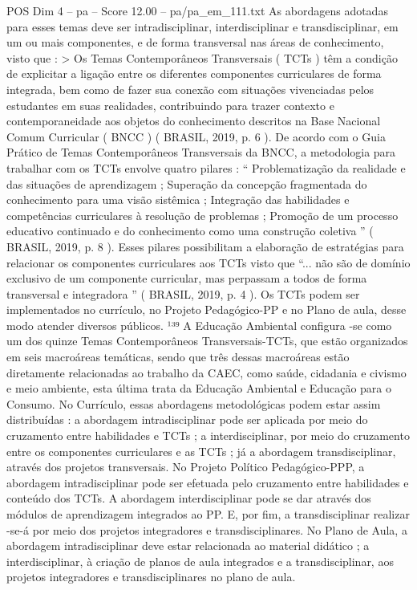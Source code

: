 \begin{textsample}{POS Dim 4 – pa – Score 12.00 – pa/pa\_em\_111.txt}
As abordagens adotadas para esses temas deve ser intradisciplinar, interdisciplinar e transdisciplinar, em um ou mais componentes, e de forma transversal nas áreas de conhecimento, visto que : > Os Temas Contemporâneos Transversais ( TCTs ) têm a condição de explicitar a ligação entre os diferentes componentes curriculares de forma integrada, bem como de fazer sua conexão com situações vivenciadas pelos estudantes em suas realidades, contribuindo para trazer contexto e contemporaneidade aos objetos do conhecimento descritos na Base Nacional Comum Curricular ( BNCC ) ( BRASIL, 2019, p. 6 ).
De acordo com o Guia Prático de Temas Contemporâneos Transversais da BNCC, a metodologia para trabalhar com os TCTs envolve quatro pilares : “ Problematização da realidade e das situações de aprendizagem ; Superação da concepção fragmentada do conhecimento para uma visão sistêmica ; Integração das habilidades e competências curriculares à resolução de problemas ; Promoção de um processo educativo continuado e do conhecimento como uma construção coletiva ” ( BRASIL, 2019, p. 8 ).
Esses pilares possibilitam a elaboração de estratégias para relacionar os componentes curriculares aos TCTs visto que “... não são de domínio exclusivo de um componente curricular, mas perpassam a todos de forma transversal e integradora ” ( BRASIL, 2019, p. 4 ).
Os TCTs podem ser implementados no currículo, no Projeto Pedagógico-PP e no Plano de aula, desse modo atender diversos públicos. ¹³⁹ A Educação Ambiental configura -se como um dos quinze Temas Contemporâneos Transversais-TCTs, que estão organizados em seis macroáreas temáticas, sendo que três dessas macroáreas estão diretamente relacionadas ao trabalho da CAEC, como saúde, cidadania e civismo e meio ambiente, esta última trata da Educação Ambiental e Educação para o Consumo.
No Currículo, essas abordagens metodológicas podem estar assim distribuídas : a abordagem intradisciplinar pode ser aplicada por meio do cruzamento entre habilidades e TCTs ; a interdisciplinar, por meio do cruzamento entre os componentes curriculares e as TCTs ; já a abordagem transdisciplinar, através dos projetos transversais.
No Projeto Político Pedagógico-PPP, a abordagem intradisciplinar pode ser efetuada pelo cruzamento entre habilidades e conteúdo dos TCTs.
A abordagem interdisciplinar pode se dar através dos módulos de aprendizagem integrados ao PP.
E, por fim, a transdisciplinar realizar -se-á por meio dos projetos integradores e transdisciplinares.
No Plano de Aula, a abordagem intradisciplinar deve estar relacionada ao material didático ; a interdisciplinar, à criação de planos de aula integrados e a transdisciplinar, aos projetos integradores e transdisciplinares no plano de aula.

\end{textsample}
